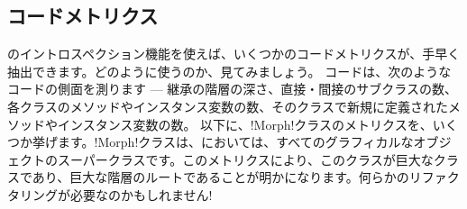 \documentclass[a4paper,10pt,twoside]{book}
\begin{document}
\important{\emph{警告:}これらの機能は、とりわけ開発ツールを定義するのに便利ですが、典型的なアプリケーションには、通常、適していません。
オブジェクトに、それが属するクラスを尋ねたり、オブジェクトがどのようなメッセージを理解するかを見つけ出そうと、それにクエリを送ったりすることは、典型的な設計上の欠陥を示すものです。なぜならそれは、カプセル化の原則を破る行為だからです。
開発ツールは、しかし、通常のアプリケーションではありません。なぜなら、開発ツールは、ソフトウェアそれ自身を対象領域とするものだからです。それで、これらのツールは、コードの内部の詳細について、深く掘り下げることを許されているのです。}


\subsection{コードメトリクス}

\st{}のイントロスペクション機能を使えば、いくつかのコードメトリクスが、手早く抽出できます。どのように使うのか、見てみましょう。
コードは、次のようなコードの側面を測ります --- 継承の階層の深さ、直接・間接のサブクラスの数、各クラスのメソッドやインスタンス変数の数、そのクラスで新規に定義されたメソッドやインスタンス変数の数。
以下に、\ct!Morph!クラスのメトリクスを、いくつか挙げます。\ct!Morph!クラスは、\pharo{}においては、すべてのグラフィカルなオブジェクトのスーパークラスです。このメトリクスにより、このクラスが巨大なクラスであり、巨大な階層のルートであることが明かになります。何らかのリファクタリングが必要なのかもしれません! 
\end{document}
